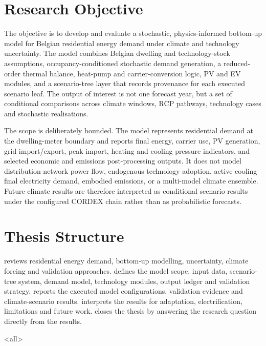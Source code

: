 \section{Research Objective}

The objective is to develop and evaluate a stochastic, physics-informed bottom-up model for Belgian residential energy demand under climate and technology uncertainty. The model combines Belgian dwelling and technology-stock assumptions, occupancy-conditioned stochastic demand generation, a reduced-order thermal balance, heat-pump and carrier-conversion logic, PV and EV modules, and a scenario-tree layer that records provenance for each executed scenario leaf. The output of interest is not one forecast year, but a set of conditional comparisons across climate windows, RCP pathways, technology cases and stochastic realisations.

The scope is deliberately bounded. The model represents residential demand at the dwelling-meter boundary and reports final energy, carrier use, PV generation, grid import/export, peak import, heating and cooling pressure indicators, and selected economic and emissions post-processing outputs. It does not model distribution-network power flow, endogenous technology adoption, active cooling final electricity demand, embodied emissions, or a multi-model climate ensemble. Future climate results are therefore interpreted as conditional scenario results under the configured CORDEX chain rather than as probabilistic forecasts.

\section{Thesis Structure}

 reviews residential energy demand, bottom-up modelling, uncertainty, climate forcing and validation approaches.  defines the model scope, input data, scenario-tree system, demand model, technology modules, output ledger and validation strategy.  reports the executed model configurations, validation evidence and climate-scenario results.  interprets the results for adaptation, electrification, limitations and future work.  closes the thesis by answering the research question directly from the results.

\mode<all> %






